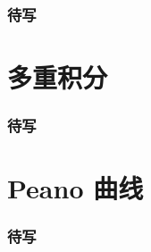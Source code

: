 
\begin{frame}
\frametitle{待写}

\end{frame}


\section{多重积分}


\begin{frame}
\frametitle{待写}

\end{frame}


\section{Peano 曲线}


\begin{frame}
\frametitle{待写}

\end{frame}



